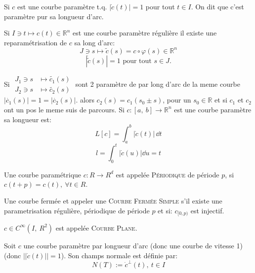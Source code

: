 	\begin{definition}
		Si $c$ est une courbe paramètre t.q. $|\dot{c}(t)|=1$ pour tout $t\in I$. On dit que c'est paramètre pur sa longueur d'arc. 
	\end{definition}

	\begin{proposition}
		Si $I\ni t\mapsto c(t)\in \mathbb{R}^n$ est une courbe paramètre régulière il existe une reparamétrisation de $c$ sa long d'arc:
		$$J\ni s\mapsto \tilde{c}(s)=c\circ\varphi(s)\in \mathbb{R}^n$$
		$$|\dot{\tilde{c}}(s)|=1 \mbox{ pour tout } s\in J.$$
	\end{proposition}

	\begin{lemme}
		Si $\begin{array}{rl} J_1\ni s &\mapsto \tilde{c_1}(s)\\ J_2\ni s &\mapsto \tilde{c_2}(s) \end{array}$ sont 2 paramètre de par long d'arc de la meme courbe $|\dot{c_1}(s)| = 1 = |\dot{c_2}(s)|$.
			alors $c_2(s)=c_1(s_0\pm s)$, pour un $s_0\in \mathbb{R}$ et si $c_1$ et $c_2$ ont un pos le meme suis de parcours. Si $c:[a,\ b]\rightarrow \mathbb{R}^n$ est une courbe paramètre sa longueur est:
			$$ L[c] = \int_{a}^{b} |\dot{c}(t)|\, \dd{}t$$
			$$l =\int_{0}^{t} |\dot{c}(u)|\dd{u} = t$$ %
	\end{lemme}


		\begin{definition}
			Une courbe paramétrique $c:R\rightarrow R^d$ est appelée \textsc{Périodique} de période $p$, si $c(t+p)=c(t),\ \forall t\in R$.
		\end{definition}

		\begin{definition}
			Une courbe fermée et appeler une \textsc{Courbe Fermée Simple} s'il existe une parametrisation régulière, périodique de période $p$ et si: $c_{[0, p)}$ est injectif.
		\end{definition}

		\begin{definition}
			$c\in C^\infty(I,\ R^2)$ est appelée \textsc{Courbe Plane}.
		\end{definition}

		\begin{definition}
			Soit $c$ une courbe paramètre par longueur d'arc (donc une courbe de vitesse 1) (donc $||\dot{c}(t)||=1$). Son champs normale est définie par:
			$$N(T):=\dot{c}^\perp(t),\ t\in I$$
		\end{definition}

